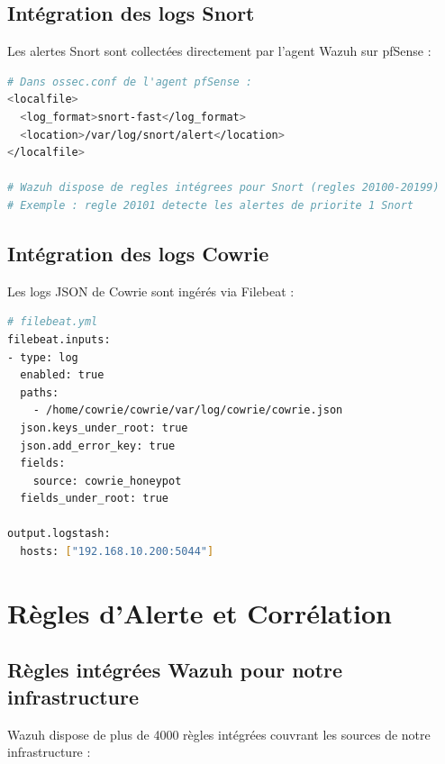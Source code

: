 \documentclass[12pt,a4paper,openany]{report}
\begin{document}
\subsection{Intégration des logs Snort}

Les alertes Snort sont collectées directement par l'agent Wazuh sur pfSense :

\begin{lstlisting}[language=bash, caption={Collecte des alertes Snort par Wazuh agent}]
# Dans ossec.conf de l'agent pfSense :
<localfile>
  <log_format>snort-fast</log_format>
  <location>/var/log/snort/alert</location>
</localfile>

# Wazuh dispose de regles intégrees pour Snort (regles 20100-20199)
# Exemple : regle 20101 detecte les alertes de priorite 1 Snort
\end{lstlisting}

\subsection{Intégration des logs Cowrie}

Les logs JSON de Cowrie sont ingérés via Filebeat :

\begin{lstlisting}[language=bash, caption={Configuration Filebeat pour logs Cowrie JSON}]
# filebeat.yml
filebeat.inputs:
- type: log
  enabled: true
  paths:
    - /home/cowrie/cowrie/var/log/cowrie/cowrie.json
  json.keys_under_root: true
  json.add_error_key: true
  fields:
    source: cowrie_honeypot
  fields_under_root: true

output.logstash:
  hosts: ["192.168.10.200:5044"]
\end{lstlisting}

\section{Règles d'Alerte et Corrélation}

\subsection{Règles intégrées Wazuh pour notre infrastructure}

Wazuh dispose de plus de 4000 règles intégrées couvrant les sources de notre infrastructure :
\end{document}
